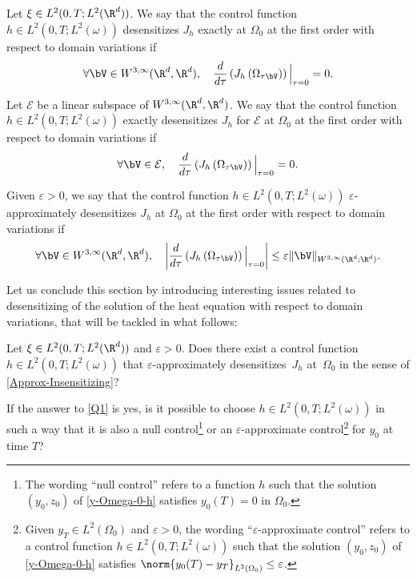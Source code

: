 \begin{definition}
Let {$\xi \in L^2(0,T; L^2(\R^d))$}.
We say that the control function $h \in L^2(0,T; L^2(\omega))$ desensitizes $J_h$ exactly at $\Omega_0$ at the first order with respect to domain variations if
\begin{equation}
\label{Exact-Insentitizing}
\forall\bV\in W^{3,\infty}(\R^d, \R^d),
\quad
\dfrac{d }{d \tau}\left(J_h \left(\Omega_{\tau\bV} \right)\right)\Big|_{\tau=0}=0.
\end{equation}

Let $\mathcal{E}$ be a linear subspace of $W^{3,\infty}(\R^d, \R^d)$.
We say that the control function $h \in L^2(0,T; L^2(\omega))$ exactly desensitizes $J_h$ for $\mathcal{E}$ at $\Omega_0$ at the first order with respect to domain variations if
\begin{equation}
\label{Finite-Insensitizing}
\forall\bV\in \mathcal{E},
\quad
\dfrac{d }{d \tau}\left(J_h \left(\Omega_{\tau\bV} \right)\right)\Big|_{\tau=0}=0.
\end{equation}

Given $\varepsilon>0$, we say that the control function $h \in L^2(0,T; L^2(\omega))$ $\varepsilon$-approximately desensitizes $J_h$ at $\Omega_0$ at the first order with respect to domain variations if
\begin{equation}
\label{Approx-Insensitizing}
\forall\bV\in W^{3,\infty}(\R^d, \R^d),
\quad
\left|\dfrac{d }{d \tau}\left(J_h\left(\Omega_{\tau \bV}\right)\right)\Big|_{\tau=0}\right |\leq \varepsilon \| \bV \|_{W^{3, \infty}(\R^d; \R^d)}.
\end{equation}
\end{definition}

Let us conclude this section by introducing interesting issues related to desensitizing of the solution of the heat equation with respect to domain variations, that will be tackled in what follows:

\label{Q1}
Let $\xi \in L^2(0,T; L^2(\R^d))$ and $\varepsilon>0$. Does there exist a control function $h \in L^2(0,T; L^2(\omega))$ that $\varepsilon$-approximately desensitizes~$J_h$ at~$\Omega_0$ in the sense of \eqref{Approx-Insensitizing}?

 \label{Q1'}
If the answer to \ref{Q1} is yes, is it possible to choose $h \in L^2(0,T; L^2(\omega))$ in such a way that it is also a null control\footnote{The wording ``null control'' refers to a function $h$ such that the solution $(y_0,z_0)$ of \eqref{y-Omega-0-h} satisfies $y_0(T) = 0$ in $\Omega_0$.} or an $\varepsilon$-approximate control\footnote{Given $y_T\in L^2(\Omega_0)$ and $\varepsilon>0$, the wording ``$\varepsilon$-approximate control'' refers to a control function $h \in L^2(0,T; L^2(\omega))$ such that the solution $(y_0,z_0)$ of \eqref{y-Omega-0-h} satisfies $\norm{y_0(T) - y_T}_{L^2(\Omega_0)} \leq \varepsilon$.} for $y_0$ at time $T$?

